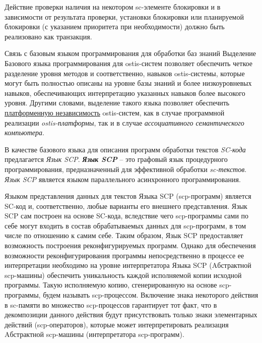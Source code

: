 Действие проверки наличия на некотором sc-элементе блокировки и в зависимости от результата проверки, установки блокировки или планируемой блокировки (с указанием приоритета при необходимости) должно быть реализовано как транзакция.

\begin{frame}{Связь с базовым языком программирования для обработки баз
знаний}
\vspace{15}
    Выделение Базового языка программирования для ostis-систем позволяет обеспечить четкое разделение уровня методов и соответственно, навыков ostis-системы, которые могут быть полностью описаны на уровне базы знаний и более низкоуровневых навыков, обеспечивающих интерпретацию указанных навыков более высокого уровня. Другими словами, выделение такого языка позволяет обеспечить \uline{платформенную независимость} ostis-систем, как в случае программной реализации \textit{ostis-платформы}, так и в случае \textit{ассоциативного семантического компьютера}.
    \par В качестве базового языка для описания программ обработки текстов \textit{SC-кода} предлагается \textit{Язык SCP}. \textbf{\textit{Язык SCP}} -- это графовый язык процедурного программирования, предназначенный для эффективной обработки \textit{sc-текстов}. \textit{Язык SCP} является языком параллельного асинхронного программирования.
\end{frame}

Языком представления данных для текстов Языка SCP (scp-программ) является SC-код и, соответственно, любые варианты его внешнего представления. Язык SCP сам построен на основе SC-кода, вследствие чего scp-программы сами по себе могут входить в состав обрабатываемых данных для scp-программ, в том числе по отношению к самим себе. Таким образом, Язык SCP предоставляет возможность построения реконфигурируемых программ. Однако для обеспечения возможности реконфигурирования программы непосредственно в процессе ее интерпретации необходимо на уровне интерпретатора Языка SCP (Aбстрактной scp-машины) обеспечить уникальность каждой исполняемой копии исходной программы. Такую исполняемую копию, сгенерированную на основе scp-программы, будем называть scp-процессом. Включение знака некоторого действия в sc-памяти во множество scp-процессов гарантирует тот факт, что в декомпозиции данного действия будут присутствовать только знаки элементарных действий (scp-операторов), которые может интерпретировать реализация Aбстрактной scp-машины (интерпретатора scp-программ).

